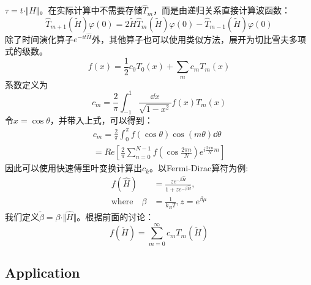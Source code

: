 $\tau=t\cdot\Vert H\Vert$。在实际计算中不需要存储$\hat{T}_m$，而是由递归关系直接计算波函数：
\begin{equation}
    \hat{T}_{m+1}(\tilde{H})\varphi(0)=2\tilde{H}\hat{T}_{m}(\tilde{H})\varphi(0)-\hat{T}_{m-1}(\tilde{H})\varphi(0)
\end{equation}
除了时间演化算子$e^{-it\hat{H}}$外，其他算子也可以使用类似方法，展开为切比雪夫多项式的级数。
\begin{equation}
    f(x)=\frac{1}{2}c_0T_0(x)+\sum_{m}c_mT_m(x)
\end{equation}
系数定义为
\begin{equation}
    c_m=\frac{2}{\pi}\int_{-1}^{1}\frac{\dd{x}}{\sqrt{1-x^2}}f(x)T_m(x)
\end{equation}
令$x=\cos{\theta}$，并带入上式，可以得到：
\begin{equation}
    \begin{aligned}
        c_m=\frac{2}{\pi}\int_{0}^{\pi}f(\cos{\theta})\cos(m\theta)\dd{\theta}\\
        =Re[\frac{2}{\pi}\sum_{n=0}^{N-1}f(\cos\frac{2\pi n}{N})e^{i\frac{2\pi n}{N}m}]
    \end{aligned}
\end{equation}
因此可以使用快速傅里叶变换计算出$c_k$。以Fermi-Dirac算符为例:
\begin{equation}
    \begin{aligned}
        f(\hat{H})&=\frac{ze^{-\beta\hat{H}}}{1+ze^{-\beta\hat{H}}},\\
        \text{where}\quad\beta&=\frac{1}{k_BT},z=e^{\beta\mu}
    \end{aligned}
\end{equation}
我们定义$\tilde{\beta}=\beta\cdot\Vert\hat{H}\Vert$。根据前面的讨论：
\begin{equation}
    f(\tilde{H})=\sum_{m=0}^{\infty}c_mT_m(\tilde{H})
\end{equation}
\subsection{Application}
